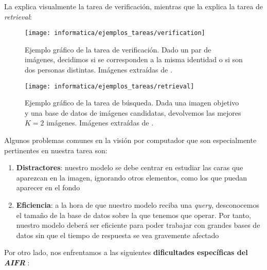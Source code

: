 

La  explica visualmente la tarea de verificación, mientras que la  explica la tarea de \textit{retrieval}:

\begin{figure}[H]
	\centering
	\texttt{[image: informatica/ejemplos\_tareas/verification]}
	\caption{Ejemplo gráfico de la tarea de verificación. Dado un par de imágenes, decidimos si se corresponden a la misma identidad o si son dos personas distintas. Imágenes extraídas de \cite{informatica:cacd_dataset}.}
	\label{img:ejemplo_verificacion}
\end{figure}

\begin{figure}[H]
	\centering
	\texttt{[image: informatica/ejemplos\_tareas/retrieval]}
	\caption{Ejemplo gráfico de la tarea de búsqueda. Dada una imagen objetivo y una base de datos de imágenes candidatas, devolvemos las mejores $K = 2$ imágenes. Imágenes extraídas de \cite{informatica:cacd_dataset}.}
	\label{img:ejemplo_retrieval}
\end{figure}

Algunos problemas comunes en la visión por computador que son especialmente pertinentes en nuestra tarea son:

\begin{enumerate}
	\item \textbf{Distractores}: nuestro modelo se debe centrar en estudiar las caras que aparezcan en la imagen, ignorando otros elementos, como los que puedan aparecer en el fondo
	\item \textbf{Eficiencia}: a la hora de que nuestro modelo reciba una \textit{query}, desconocemos el tamaño de la base de datos sobre la que tenemos que operar. Por tanto, nuestro modelo deberá ser eficiente para poder trabajar con grandes bases de datos sin que el tiempo de respuesta se vea gravemente afectado
\end{enumerate}

Por otro lado, nos enfrentamos a las siguientes \textbf{dificultades específicas del \textit{AIFR}} \cite{informatica:challenges_retrieval}:

